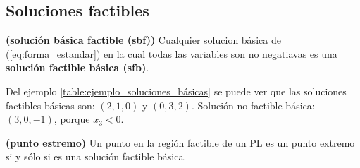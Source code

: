 \documentclass[../main.tex]{subfiles}
\begin{document}
    \subsection{Soluciones factibles}    
        \begin{definition} \textbf{(solución básica factible (sbf))}
            Cualquier solucion básica de (\ref{eq:forma_estandar}) en la cual todas las variables son no negatiavas es una  \textbf{solución factible básica (sfb)}.
        \end{definition}

        Del ejemplo \ref{table:ejemplo_soluciones_básicas} se puede ver que las soluciones factibles básicas son: $(2,1,0)$ y $(0,3,2)$. Solución no factible básica: $(3,0,-1)$, porque $x_3 < 0$.

        \begin{theorem} \textbf{(punto estremo)}
            Un punto en la región factible de un PL es un punto extremo si y sólo si es una solución factible básica.
            
        \end{theorem}
\end{document}
